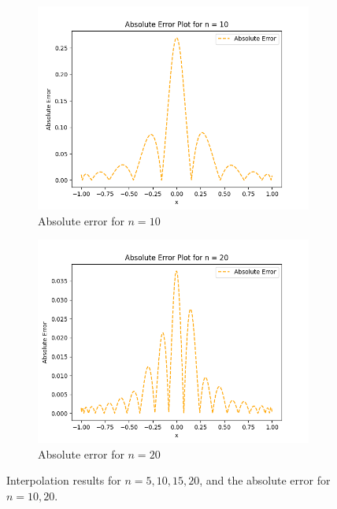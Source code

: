 \documentclass[a4paper]{article}
\begin{document}
\begin{figure}[htbp]
    \begin{subfigure}[b]{0.48\textwidth}
        \includegraphics[width = \textwidth]{../results/Task_C/Absolute_Error_Plot_n_10.png}
        \caption{Absolute error for $n = 10$}
    \end{subfigure}
    \hfill
    \begin{subfigure}[b]{0.48\textwidth}
        \includegraphics[width = \textwidth]{../results/Task_C/Absolute_Error_Plot_n_20.png}
        \caption{Absolute error for $n = 20$}
    \end{subfigure}

    \caption{Interpolation results for $n = 5, 10, 15, 20$, and the absolute error for $n = 10, 20.$}
    \label{fig:C.results}
\end{figure}
\end{document}
